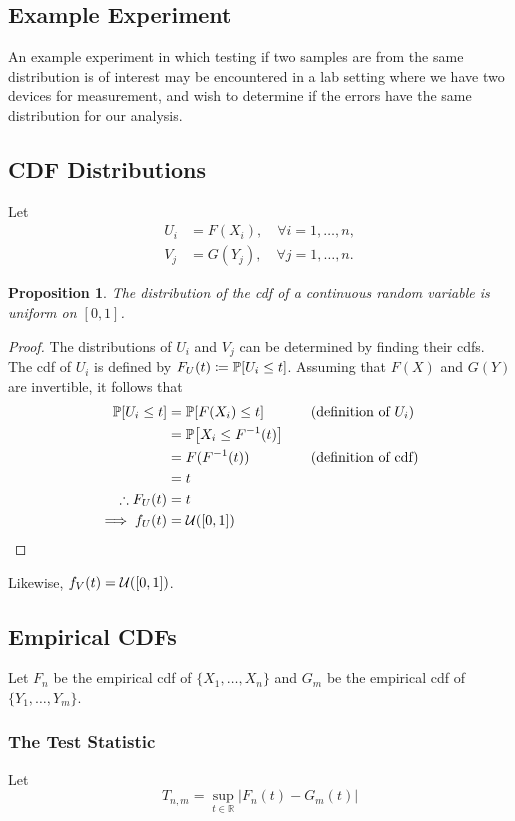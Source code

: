 \documentclass[letterpaper, oneside, reqno]{amsart}
\newtheorem{prop}{Proposition}[section]
\numberwithin{equation}{section}
\newcommand{\Prob}[1]{\mathbb{P}\mleft[#1\mright]}
\newcommand{\R}{\mathbb{R}}  %
\newcommand{\U}[2]{\mathcal{U}\mleft(\mleft[ #1, #2 \mright]\mright)}
\newcommand{\by}[1]{&\quad&\text{(#1)}}
\begin{document}
\subsection{Example Experiment}
An example experiment in which testing if two samples are from the same
distribution is of interest may be encountered in a lab setting where we have
two devices for measurement, and wish to determine if the errors have the same
distribution for our analysis. 

\subsection{CDF Distributions}
Let 
\begin{align*}
  U_i &= F(X_i), \quad \forall i = 1, \dots, n, \\
  V_j &= G(Y_j), \quad \forall j = 1, \dots, n.
\end{align*}

\begin{prop}
  The distribution of the cdf of a continuous random variable is uniform on $[0,
  1]$.
\end{prop}

\begin{proof}
The distributions of $U_i$ and $V_j$ can be determined by finding their cdfs.
The cdf of $U_i$ is defined by $F_U(t) \coloneqq \Prob{U_i \le t}$. Assuming that $F(X)$ and $G(Y)$ are invertible, it follows that
\begin{alignat*}{3}
  \Prob{U_i \le t} &= \Prob{F(X_i) \le t} \by{definition of $U_i$} \\
                   &= \Prob{X_i \le F^{-1}(t)} \\
                   &= F(F^{-1}(t)) \by{definition of cdf} \\
                   &= t \\
  \therefore F_U(t) &= t \\
  \implies f_U(t) &= \U{0}{1} \qedhere
\end{alignat*}
\end{proof}
Likewise, $f_V(t) = \U{0}{1}$.

\subsection{Empirical CDFs}
Let $F_n$ be the empirical cdf of $\{X_1, \dots, X_n\}$ and $G_m$ be the
empirical cdf of $\{Y_1, \dots, Y_m\}$.

\subsubsection{The Test Statistic}
Let
\begin{equation}
  T_{n,m} = \sup_{t \in \R} \left| F_n(t) - G_m(t) \right|
\end{equation}
\end{document}
